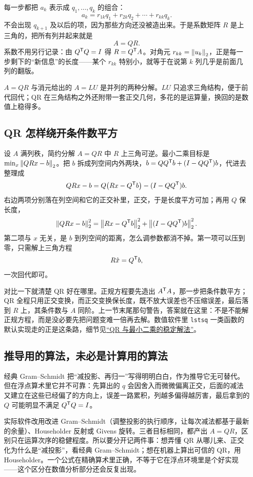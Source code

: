 每一步都把 \(a_k\) 表示成 \(q_1,\ldots,q_k\) 的组合：
\[
a_k=r_{1k}q_1+r_{2k}q_2+\cdots+r_{kk}q_k .
\]
不会出现 \(q_{k+1}\) 及以后的项，因为那些方向还没被造出来。于是系数矩阵 \(R\) 是上三角的，把所有列并起来就是
\[
A=QR .
\]
系数不用另行记录：由 \(Q^{\mathsf{T}}Q=I\) 得 \(R=Q^{\mathsf{T}}A\)。对角元 \(r_{kk}=\left\lVert u_k\right\rVert_2\)，正是每一步剩下的``新信息''的长度——某个 \(r_{kk}\) 特别小，就等于在说第 \(k\) 列几乎是前面几列的翻版。

\(A=QR\) 与消元给出的 \(A=LU\) 是并列的两种分解。\(LU\) 只追求三角结构，便于前代回代；QR 在三角结构之外还附带一套正交几何，多花的是运算量，换回的是数值上稳得多。

\subsection{QR 怎样绕开条件数平方}

设 \(A\) 满列秩，简约分解 \(A=QR\) 中 \(R\) 上三角可逆。最小二乘目标是 \(\min_x\left\lVert QRx-b\right\rVert_2\)。把 \(b\) 拆成列空间内外两块，\(b=QQ^{\mathsf{T}}b+(I-QQ^{\mathsf{T}})b\)，代进去整理成
\[
QRx-b=Q\bigl(Rx-Q^{\mathsf{T}}b\bigr)-(I-QQ^{\mathsf{T}})b .
\]
右边两项分别落在列空间和它的正交补里，正交，于是长度平方可加；再用 \(Q\) 保长度，
\[
\left\lVert QRx-b\right\rVert_2^2=\left\lVert Rx-Q^{\mathsf{T}}b\right\rVert_2^2+\left\lVert(I-QQ^{\mathsf{T}})b\right\rVert_2^2 .
\]
第二项与 \(x\) 无关，是 \(b\) 到列空间的距离，怎么调参数都消不掉。第一项可以压到零，只需解上三角方程
\[
R\hat x=Q^{\mathsf{T}}b ,
\]
一次回代即可。

对比一下就清楚 QR 好在哪里。正规方程要先造出 \(A^{\mathsf{T}}A\)，那一步把条件数平方；QR 全程只用正交变换，而正交变换保长度，既不放大误差也不压缩误差，最后落到 \(R\) 上，其条件数与 \(A\) 同阶。上一节末尾那句警告，答案就在这里：不是不能解正规方程，而是没必要先把问题变难一倍再去解。数值软件里 \verb|lstsq| 一类函数的默认实现走的正是这条路，细节见\hyperref[sec:08-Numerical-Analysis/05-Numerical-Linear-Algebra/02]{``QR 与最小二乘的稳定解法''}。

\subsection{推导用的算法，未必是计算用的算法}

经典 Gram--Schmidt 把``减投影、再归一''写得明明白白，作为推导它无可替代。但在浮点算术里它并不可靠：先算出的 \(q\) 会因舍入而微微偏离正交，后面的减法又建立在这些已经偏了的方向上，误差一路累积，列越多偏得越厉害，最后拿到的 \(Q\) 可能明显不满足 \(Q^{\mathsf{T}}Q=I\)。

实际软件改用改进 Gram--Schmidt（调整投影的执行顺序，让每次减法都基于最新的余量）、Householder 反射或 Givens 旋转。三者目标相同，都产出 \(A=QR\)，区别只在运算次序的稳健程度。所以要分开记两件事：想弄懂 QR 从哪儿来、正交化为什么是``减投影''，看经典 Gram--Schmidt；想在机器上算出可信的 QR，用 Householder。一个公式在精确算术里正确，不等于它在浮点环境里是个好实现——这个区分在数值分析部分还会反复出现。

